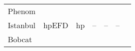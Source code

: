 \begin{tabular}{|l||c|c|c|c|c|c|}
Phenom		&
\multirow{3}{*}{hpEFD}	& %
\multirow{3}{*}{hp}	& %
\multirow{3}{*}{--}	& %
\multirow{3}{*}{--} 	& %
\multirow{3}{*}{--}	\\ %

Istanbul		&
			& %
			& %
			& %
			& %
			\\ %

Bobcat			&
			& %
			& %
			& %
			& %
			\\ %
\hline

\end{tabular}



